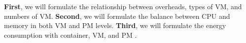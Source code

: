 \begin{enumerate}

	\textbf{First}, we will formulate the relationship between overheads, types of VM, and numbers of VM. 
	\textbf{Second}, we will formulate the balance between CPU and memory in both VM and PM levels.
	\textbf{Third}, we will formulate the energy consumption with container, VM, and PM \cite{Ferdaus:2014ep, Xu:2010vh, Gao:2013gg}.
	


\end{enumerate}
